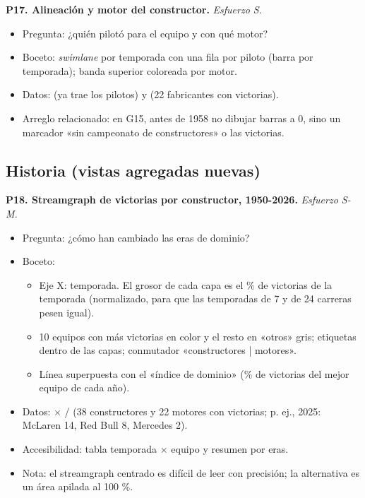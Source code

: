 \textbf{P17. Alineación y motor del constructor.} \emph{Esfuerzo S.}

\begin{itemize}
\item Pregunta: ¿quién pilotó para el equipo y con qué motor?
\item Boceto: \emph{swimlane} por temporada con una fila por piloto (barra por temporada); banda superior coloreada por motor.
\item Datos:  (ya trae los pilotos) y  (22 fabricantes con victorias).
\item Arreglo relacionado: en G15, antes de 1958 no dibujar barras a 0, sino un marcador «sin campeonato de constructores» o las victorias.
\end{itemize}

\subsection{Historia (vistas agregadas nuevas)}

\textbf{P18. Streamgraph de victorias por constructor, 1950-2026.} \emph{Esfuerzo S-M.}

\begin{itemize}
\item Pregunta: ¿cómo han cambiado las eras de dominio?
\item Boceto:
\begin{itemize}
\item Eje X: temporada. El grosor de cada capa es el \% de victorias de la temporada (normalizado, para que las temporadas de 7 y de 24 carreras pesen igual).
\item 10 equipos con más victorias en color y el resto en «otros» gris; etiquetas dentro de las capas; conmutador «constructores | motores».
\item Línea superpuesta con el «índice de dominio» (\% de victorias del mejor equipo de cada año).
\end{itemize}
\item Datos:  × / (38 constructores y 22 motores con victorias; p. ej., 2025: McLaren 14, Red Bull 8, Mercedes 2).
\item Accesibilidad: tabla temporada × equipo y resumen por eras.
\item Nota: el streamgraph centrado es difícil de leer con precisión; la alternativa es un área apilada al 100 \%.
\end{itemize}

